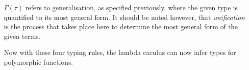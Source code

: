 \documentclass{l4proj}
\begin{document}
$\bar \Gamma(\tau)$ refers to generalisation, as specified previously, where the given type is quantified to its most general form.
It should be noted however, that \emph{unification} is the process that takes place here to determine the most general form of the given terms.

Now with these four typing rules, the lambda caculus can now infer types for polymorphic functions.

    

    
    
    
    
\end{document}
